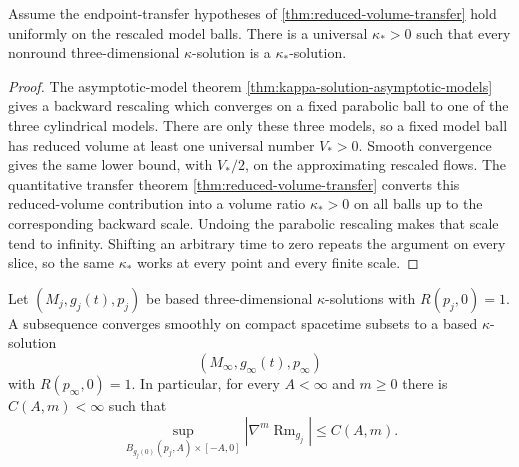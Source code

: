 \begin{proposition}
\label{prop:universal-nonround-kappa}
\notready
Assume the endpoint-transfer hypotheses of \ref{thm:reduced-volume-transfer}
hold uniformly on the rescaled model balls.  There is a universal
$\kappa_*>0$ such that every nonround
three-dimensional $\kappa$-solution is a $\kappa_*$-solution.
\end{proposition}

\begin{proof}
The asymptotic-model theorem
\ref{thm:kappa-solution-asymptotic-models} gives a backward rescaling which
converges on a fixed parabolic ball to one of the three cylindrical models.
There are only these three models, so a fixed model ball has reduced
volume at least one universal number $V_*>0$.  Smooth convergence gives the
same lower bound, with $V_*/2$, on the approximating rescaled flows.
The quantitative transfer theorem \ref{thm:reduced-volume-transfer} converts
this reduced-volume contribution into a volume ratio
$\kappa_*>0$ on all balls up to the corresponding backward scale.  Undoing
the parabolic rescaling makes that scale tend to infinity.  Shifting an
arbitrary time to zero repeats the argument on every slice, so the same
$\kappa_*$ works at every point and every finite scale.
\end{proof}

\begin{theorem}
\label{thm:kappa-solution-compactness}
\notready
Let $(M_j,g_j(t),p_j)$ be based three-dimensional $\kappa$-solutions with
$R(p_j,0)=1$.  A subsequence converges smoothly on compact spacetime
subsets to a based $\kappa$-solution
\[
 (M_\infty,g_\infty(t),p_\infty)
\]
with $R(p_\infty,0)=1$.
In particular, for every $A<\infty$ and $m\ge0$ there is $C(A,m)<\infty$
such that
\[
 \sup_{B_{g_j(0)}(p_j,A)\times[-A,0]}
 |\nabla^m\operatorname{Rm}_{g_j}|\le C(A,m).
\]
\end{theorem}

